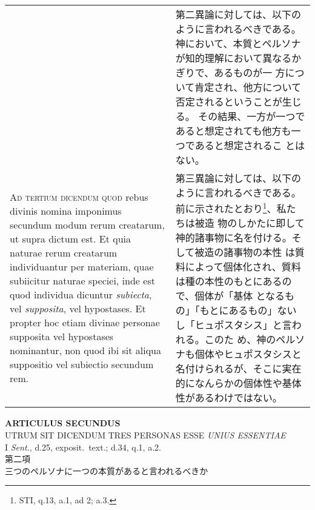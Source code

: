 \documentclass[10pt]{jsarticle} %
\begin{document}
\begin{longtable}{p{21em}p{21em}}
&

第二異論に対しては、以下のように言われるべきである。
神において、本質とペルソナが知的理解において異なるかぎりで、あるものが一
 方について肯定され、他方について否定されるということが生じる。
その結果、一方が一つであると想定されても他方も一つであると想定されるこ
 とはない。


\\



{\scshape Ad tertium dicendum quod} rebus divinis nomina imponimus secundum modum
rerum creatarum, ut supra dictum est. Et quia naturae rerum creatarum
individuantur per materiam, quae subiicitur naturae speciei, inde est
quod individua dicuntur {\itshape subiecta}, vel {\itshape supposita}, vel hypostases. Et
propter hoc etiam divinae personae supposita vel hypostases nominantur,
non quod ibi sit aliqua suppositio vel subiectio secundum rem.


&

第三異論に対しては、以下のように言われるべきである。
前に示されたとおり\footnote{STI, q.13, a.1, ad 2; a.3.}、私たちは被造
 物のしかたに即して神的諸事物に名を付ける。そして被造の諸事物の本性
 は質料によって個体化され、質料は種の本性のもとにあるので、個体が「基体
となるもの」「もとにあるもの」ないし「ヒュポスタシス」と言われる。このた
 め、神のペルソナも個体やヒュポスタシスと名付けられるが、そこに実在
 的になんらかの個体性や基体性があるわけではない。


\end{longtable}
\newpage






\begin{center}
 {\Large {\bf ARTICULUS SECUNDUS}}\\
 {\large UTRUM SIT DICENDUM TRES PERSONAS ESSE {\itshape UNIUS ESSENTIAE}}\\
 {\footnotesize I {\itshape Sent.}, d.25, exposit.~text.; d.34, q.1, a.2.}\\
 {\Large 第二項\\三つのペルソナに一つの本質があると言われるべきか}
\end{center}
\end{document}
